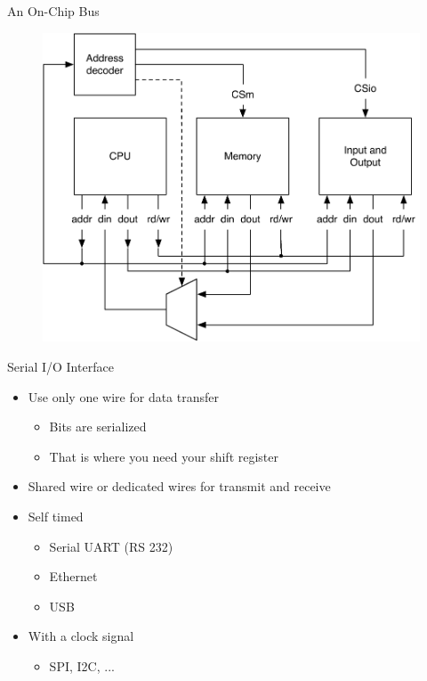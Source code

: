 \begin{frame}[fragile]{An On-Chip Bus}
\begin{figure}
  \includegraphics[scale=0.6]{../figures/bus-on-chip}
\end{figure}
\end{frame}

\begin{frame}[fragile]{Serial I/O Interface}
\begin{itemize}
\item Use only one wire for data transfer
\begin{itemize}
\item Bits are serialized
\item That is where you need your shift register
\end{itemize}
\item Shared wire or dedicated wires for transmit and receive
\item Self timed
\begin{itemize}
\item Serial UART (RS 232)
\item Ethernet
\item USB
\end{itemize}
\item With a clock signal
\begin{itemize}
\item SPI, I2C, ...
\end{itemize}
\end{itemize}
\end{frame}



